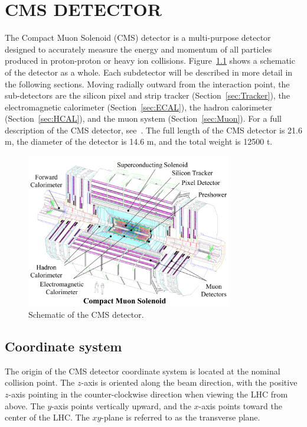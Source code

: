 \chapter{CMS DETECTOR}
\label{chap:Detector}

The Compact Muon Solenoid (CMS) detector is a multi-purpose detector designed to accurately measure the energy and momentum of all particles produced in proton-proton or heavy ion collisions. Figure~\ref{fig:CMS}  shows a schematic of the detector as a whole. Each subdetector will be described in more detail in the following sections. Moving radially outward from the interaction point, the sub-detectors are the silicon pixel and strip tracker (Section~\ref{sec:Tracker}), the electromagnetic calorimeter (Section~\ref{sec:ECAL}), the hadron calorimeter (Section~\ref{sec:HCAL}), and the muon system (Section~\ref{sec:Muon}). For a full description of the CMS detector, see~\cite{Chatrchyan2008zzk}. The full length of the CMS detector is 21.6 m, the diameter of the detector is 14.6 m, and the total weight is 12500 t.

\begin{figure}[h!]
	\centering
	\includegraphics[width=0.8\textwidth]{Figures/Detector/cms_labelled.pdf}
       \caption{Schematic of the CMS detector.
	}
   	\label{fig:CMS}
\end{figure}


\section{Coordinate system}
\label{sec:coordinates}
The origin of the CMS detector coordinate system is located at the nominal collision point. The $z$-axis is oriented along the beam direction, with the positive $z$-axis pointing in the counter-clockwise direction when viewing the LHC from above. The $y$-axis points vertically upward, and the $x$-axis points toward the center of the LHC. The $xy$-plane is referred to as the transverse plane.

